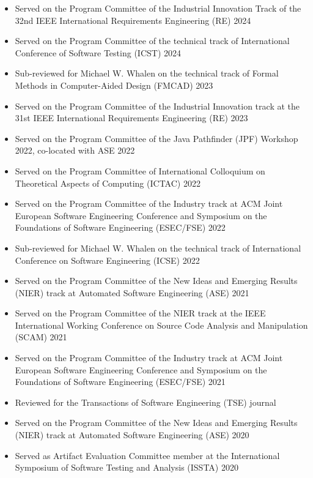 \documentclass[letterpaper,10pt]{article}
\begin{document}
\begin{itemize}
  \item Served on the Program Committee of the Industrial Innovation Track of the 32nd IEEE International Requirements Engineering (RE) 2024
  \item Served on the Program Committee of the technical track of International Conference of Software Testing (ICST) 2024
  \item Sub-reviewed for Michael W. Whalen on the technical track of Formal Methods in Computer-Aided Design (FMCAD) 2023
  \item Served on the Program Committee of the Industrial Innovation track at the 31st IEEE International Requirements Engineering (RE) 2023
  \item Served on the Program Committee of the Java Pathfinder (JPF) Workshop 2022, co-located with ASE 2022
  \item Served on the Program Committee of International Colloquium on Theoretical Aspects of Computing (ICTAC) 2022
  \item Served on the Program Committee of the Industry track at ACM Joint European Software Engineering Conference and Symposium on the Foundations of Software Engineering (ESEC/FSE) 2022
  \item Sub-reviewed for Michael W. Whalen on the technical track of International Conference on Software Engineering (ICSE) 2022
  \item Served on the Program Committee of the New Ideas and Emerging Results (NIER) track at Automated Software Engineering (ASE) 2021
  \item Served on the Program Committee of the NIER track at the IEEE International Working Conference on Source Code Analysis and Manipulation (SCAM) 2021
  \item Served on the Program Committee of the Industry track at ACM Joint European Software Engineering Conference and Symposium on the Foundations of Software Engineering (ESEC/FSE) 2021
  \item Reviewed for the Transactions of Software Engineering (TSE) journal
  \item Served on the Program Committee of the New Ideas and Emerging Results (NIER) track at Automated Software Engineering (ASE) 2020
  \item Served as Artifact Evaluation Committee member at the International Symposium of Software Testing and Analysis (ISSTA) 2020

\end{itemize}
\end{document}
